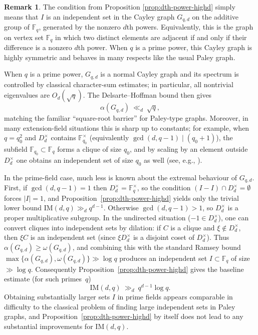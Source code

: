 \documentclass[12pt,reqno]{amsart}
\theoremstyle{plain}
\theoremstyle{definition}
\newtheorem{remark}[theorem]{Remark}
\newcommand{\F}{\mathbb{F}}
\newcommand{\IM}{\mathrm{IM}}
\newcommand{\1}{\mathbf{1}}
\begin{document}
\medskip

\begin{remark}
The condition from Proposition \ref{prop:dth-power-highd} simply means that $I$ is an independent set in the Cayley graph $G_{q,d}$ on the additive group of $\F_q$, generated by the nonzero $d$th powers.
Equivalently, this is the graph on vertex set $\F_q$ in which two distinct elements are adjacent if and only if their difference is a nonzero $d$th power. When $q$ is a prime power, this Cayley graph is highly symmetric and behaves in many respects like the usual Paley graph. 

When $q$ is a prime power, $G_{q,d}$ is a normal Cayley graph and its spectrum is controlled by classical
character-sum estimates; in particular, all nontrivial eigenvalues are $O_d(\sqrt q)$.
The Delsarte--Hoffman bound then gives
\[
  \alpha(G_{q,d})\ \ll_d\ \sqrt q,
\]
matching the familiar ``square-root barrier'' for Paley-type graphs.
Moreover, in many extension-field situations this is sharp up to constants; for example, when $q=q_0^2$ and
$D_d^\times$ contains $\F_{q_0}^\times$ (equivalently $\gcd(d,q-1)\mid(q_0+1)$), the subfield $\F_{q_0}\subset\F_q$
forms a clique of size $q_0$, and by scaling by an element outside $D_d^\times$ one obtains an independent set of
size $q_0$ as well (see, e.g., \cite{Yip2021}).

In the prime-field case, much less is known about the extremal behaviour of $G_{q,d}$.
First, if $\gcd(d,q-1)=1$ then $D_d^\times=\F_q^\times$, so the condition $(I-I)\cap D_d^\times=\emptyset$ forces $|I|=1$,
and Proposition~\ref{prop:dth-power-highd} yields only the trivial lower bound $\IM(d,q)\gg_d q^{d-1}$.
Otherwise $\gcd(d,q-1)>1$, so $D_d^\times$ is a proper multiplicative subgroup.
In the undirected situation ($-1\in D_d^\times$), one can convert cliques into independent sets by dilation:
if $C$ is a clique and $\xi\notin D_d^\times$, then $\xi C$ is an independent set (since
$\xi D_d^\times$ is a disjoint coset of $D_d^\times$).
Thus $\alpha(G_{q,d})\ge \omega(G_{q,d})$, and combining this with the standard Ramsey bound
$\max\{\alpha(G_{q,d}),\omega(G_{q,d})\}\gg \log q$ produces an independent set $I\subset\F_q$ of size $\gg\log q$.
Consequently Proposition~\ref{prop:dth-power-highd} gives the baseline estimate (for such primes~$q$)
\[
  \IM(d,q)\ \gg_d\ q^{d-1}\log q.
\]
Obtaining substantially larger sets $I$ in prime fields appears comparable in difficulty to the classical
problem of finding large independent sets in Paley graphs, and Proposition~\ref{prop:dth-power-highd} by itself does not lead to any substantial improvements for $\IM(d, q)$. 


\end{remark}
\end{document}
